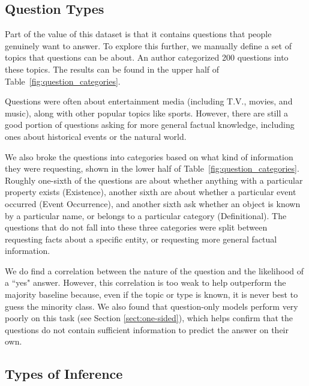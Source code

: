 \newcommand{\tmini}[1]{\multirow{2}{*}{

\begin{minipage}{5cm}#1\end{minipage}

}}

\subsection{Question Types} Part of the value of this dataset is that it contains questions that people genuinely want to answer. To explore this further, we manually define a set of topics that questions can be about. An author categorized 200 questions into these topics. The results can be found in the upper half of Table~\ref{fig:question_categories}.

Questions were often about entertainment media (including T.V., movies, and music), along with other popular topics like sports. However, there are still a good portion of questions asking for more general factual knowledge, including ones about historical events or the natural world.

We also broke the questions into categories based on what kind of information they were requesting, shown in the lower half of Table~\ref{fig:question_categories}. Roughly one-sixth of the questions are about whether anything with a particular property exists (Existence), another sixth are about whether a particular event occurred (Event Occurrence), and another sixth ask whether an object is known by a particular name, or belongs to a particular category (Definitional). The questions that do not fall into these three categories were split between requesting facts about a specific entity, or requesting more general factual information.

We do find a correlation between the nature of the question and the likelihood of a ``yes" answer. However, this correlation is too weak to help outperform the majority baseline because, even if the topic or type is known, it is never best to guess the minority class. We also found that question-only models perform very poorly on this task (see Section \ref{sect:one-sided}), which helps confirm that the questions do not contain sufficient information to predict the answer on their own.

\subsection{Types of Inference}
\label{sect:inferences}

